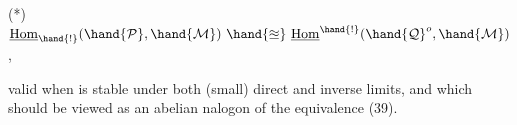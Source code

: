 
(*) \qquad $\underline{\mathrm{Hom}}_{\hand{!}}(\hand{\mathcal{P}},\hand{\mathcal{M}})\ \hand{\approxeq}\ \underline{\mathrm{Hom}}^{\hand{!}}(\hand{\mathcal{Q}}^{o},\hand{\mathcal{M}})$ \qquad ,

valid when   is stable under both (small) direct and inverse limits,
and which should be viewed as an abelian nalogon of the equivalence (39).

